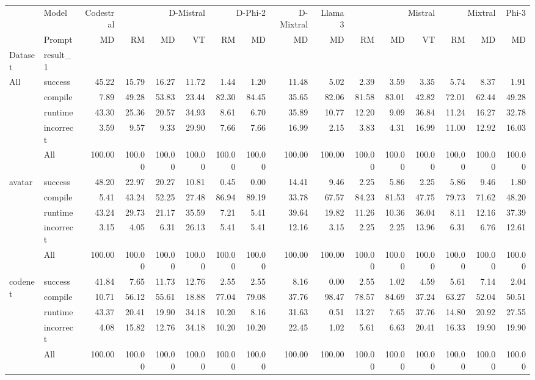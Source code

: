 \begin{tabular}{llrrrrrrrrrrrrrr}
\toprule
 & Model & Codestral & \multicolumn{3}{r}{D-Mistral} & \multicolumn{2}{r}{D-Phi-2} & D-Mixtral & Llama 3 & \multicolumn{3}{r}{Mistral} & \multicolumn{2}{r}{Mixtral} & Phi-3 \\
 & Prompt & MD & RM & MD & VT & RM & MD & MD & MD & RM & MD & VT & RM & MD & MD \\
Dataset & result_1 &  &  &  &  &  &  &  &  &  &  &  &  &  &  \\
\midrule
\multirow[t]{5}{*}{All} & success & 45.22 & 15.79 & 16.27 & 11.72 & 1.44 & 1.20 & 11.48 & 5.02 & 2.39 & 3.59 & 3.35 & 5.74 & 8.37 & 1.91 \\
 & compile & 7.89 & 49.28 & 53.83 & 23.44 & 82.30 & 84.45 & 35.65 & 82.06 & 81.58 & 83.01 & 42.82 & 72.01 & 62.44 & 49.28 \\
 & runtime & 43.30 & 25.36 & 20.57 & 34.93 & 8.61 & 6.70 & 35.89 & 10.77 & 12.20 & 9.09 & 36.84 & 11.24 & 16.27 & 32.78 \\
 & incorrect & 3.59 & 9.57 & 9.33 & 29.90 & 7.66 & 7.66 & 16.99 & 2.15 & 3.83 & 4.31 & 16.99 & 11.00 & 12.92 & 16.03 \\
 & All & 100.00 & 100.00 & 100.00 & 100.00 & 100.00 & 100.00 & 100.00 & 100.00 & 100.00 & 100.00 & 100.00 & 100.00 & 100.00 & 100.00 \\
\cline{1-16}
\multirow[t]{5}{*}{avatar} & success & 48.20 & 22.97 & 20.27 & 10.81 & 0.45 & 0.00 & 14.41 & 9.46 & 2.25 & 5.86 & 2.25 & 5.86 & 9.46 & 1.80 \\
 & compile & 5.41 & 43.24 & 52.25 & 27.48 & 86.94 & 89.19 & 33.78 & 67.57 & 84.23 & 81.53 & 47.75 & 79.73 & 71.62 & 48.20 \\
 & runtime & 43.24 & 29.73 & 21.17 & 35.59 & 7.21 & 5.41 & 39.64 & 19.82 & 11.26 & 10.36 & 36.04 & 8.11 & 12.16 & 37.39 \\
 & incorrect & 3.15 & 4.05 & 6.31 & 26.13 & 5.41 & 5.41 & 12.16 & 3.15 & 2.25 & 2.25 & 13.96 & 6.31 & 6.76 & 12.61 \\
 & All & 100.00 & 100.00 & 100.00 & 100.00 & 100.00 & 100.00 & 100.00 & 100.00 & 100.00 & 100.00 & 100.00 & 100.00 & 100.00 & 100.00 \\
\cline{1-16}
\multirow[t]{5}{*}{codenet} & success & 41.84 & 7.65 & 11.73 & 12.76 & 2.55 & 2.55 & 8.16 & 0.00 & 2.55 & 1.02 & 4.59 & 5.61 & 7.14 & 2.04 \\
 & compile & 10.71 & 56.12 & 55.61 & 18.88 & 77.04 & 79.08 & 37.76 & 98.47 & 78.57 & 84.69 & 37.24 & 63.27 & 52.04 & 50.51 \\
 & runtime & 43.37 & 20.41 & 19.90 & 34.18 & 10.20 & 8.16 & 31.63 & 0.51 & 13.27 & 7.65 & 37.76 & 14.80 & 20.92 & 27.55 \\
 & incorrect & 4.08 & 15.82 & 12.76 & 34.18 & 10.20 & 10.20 & 22.45 & 1.02 & 5.61 & 6.63 & 20.41 & 16.33 & 19.90 & 19.90 \\
 & All & 100.00 & 100.00 & 100.00 & 100.00 & 100.00 & 100.00 & 100.00 & 100.00 & 100.00 & 100.00 & 100.00 & 100.00 & 100.00 & 100.00 \\
\cline{1-16}
\bottomrule
\end{tabular}

